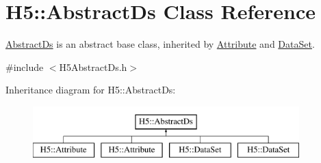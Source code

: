 \hypertarget{class_h5_1_1_abstract_ds}{}\section{H5\+:\+:Abstract\+Ds Class Reference}
\label{class_h5_1_1_abstract_ds}


\hyperlink{class_h5_1_1_abstract_ds}{Abstract\+Ds} is an abstract base class, inherited by \hyperlink{class_h5_1_1_attribute}{Attribute} and \hyperlink{class_h5_1_1_data_set}{Data\+Set}.  




{\ttfamily \#include $<$H5\+Abstract\+Ds.\+h$>$}

Inheritance diagram for H5\+:\+:Abstract\+Ds\+:\begin{figure}[H]
\begin{center}
\leavevmode
\includegraphics[height=2.000000cm]{class_h5_1_1_abstract_ds}
\end{center}
\end{figure}
